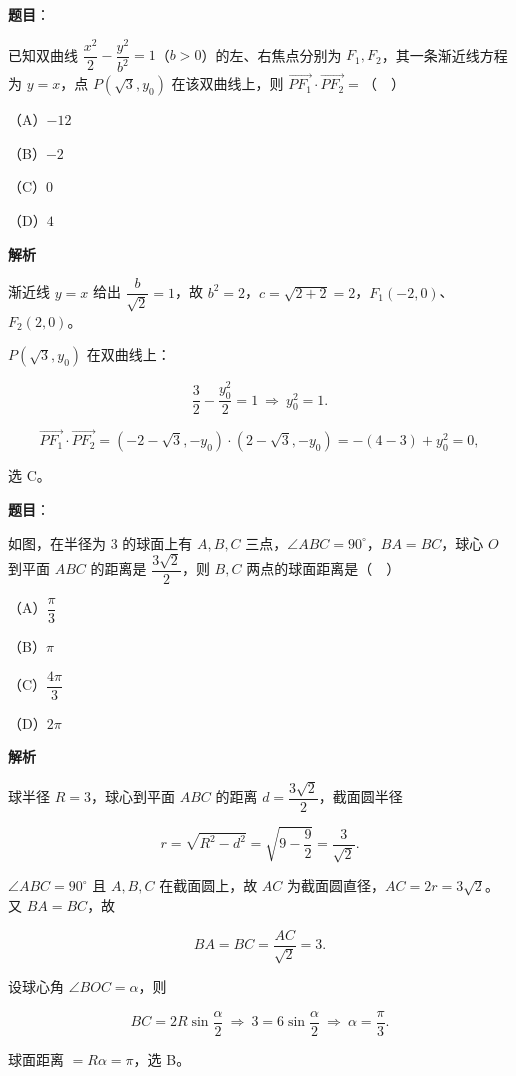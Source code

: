 \begin{answer}

\textbf{题目}：

已知双曲线 $\dfrac{x^2}{2}-\dfrac{y^2}{b^2}=1$（$b>0$）的左、右焦点分别为 $F_1,F_2$，其一条渐近线方程为 $y=x$，点 $P(\sqrt3,y_0)$ 在该双曲线上，则 $\overrightarrow{PF_1}\cdot\overrightarrow{PF_2}=$（　）

（A）$-12$

（B）$-2$

（C）$0$

（D）$4$

\textbf{解析}

渐近线 $y=x$ 给出 $\dfrac{b}{\sqrt2}=1$，故 $b^2=2$，$c=\sqrt{2+2}=2$，$F_1(-2,0)$、$F_2(2,0)$。

$P(\sqrt3,y_0)$ 在双曲线上：

\nopagebreak[4]
\[\frac32-\frac{y_0^2}{2}=1\ \Longrightarrow\ y_0^2=1 .\]

\nopagebreak[4]
\[\overrightarrow{PF_1}\cdot\overrightarrow{PF_2}
=(-2-\sqrt3,-y_0)\cdot(2-\sqrt3,-y_0)
=-(4-3)+y_0^2=0,\]

选 C。


\end{answer}
\begin{answer}

\textbf{题目}：

如图，在半径为 $3$ 的球面上有 $A,B,C$ 三点，$\angle ABC=90^\circ$，$BA=BC$，球心 $O$ 到平面 $ABC$ 的距离是 $\dfrac{3\sqrt2}{2}$，则 $B,C$ 两点的球面距离是（　）
\nopagebreak[4]
\begin{center}\end{center}
\nopagebreak[4]
（A）$\dfrac{\pi}{3}$

（B）$\pi$

（C）$\dfrac{4\pi}{3}$

（D）$2\pi$

\textbf{解析}

球半径 $R=3$，球心到平面 $ABC$ 的距离 $d=\dfrac{3\sqrt2}{2}$，截面圆半径

\nopagebreak[4]
\[r=\sqrt{R^2-d^2}=\sqrt{9-\frac92}=\frac{3}{\sqrt2}.\]

$\angle ABC=90^\circ$ 且 $A,B,C$ 在截面圆上，故 $AC$ 为截面圆直径，$AC=2r=3\sqrt2$。又 $BA=BC$，故

\nopagebreak[4]
\[BA=BC=\frac{AC}{\sqrt2}=3 .\]

设球心角 $\angle BOC=\alpha$，则

\nopagebreak[4]
\[BC=2R\sin\frac\alpha2\ \Longrightarrow\ 3=6\sin\frac\alpha2
\ \Longrightarrow\ \alpha=\frac\pi3 .\]

球面距离 $=R\alpha=\pi$，选 B。


\end{answer}
